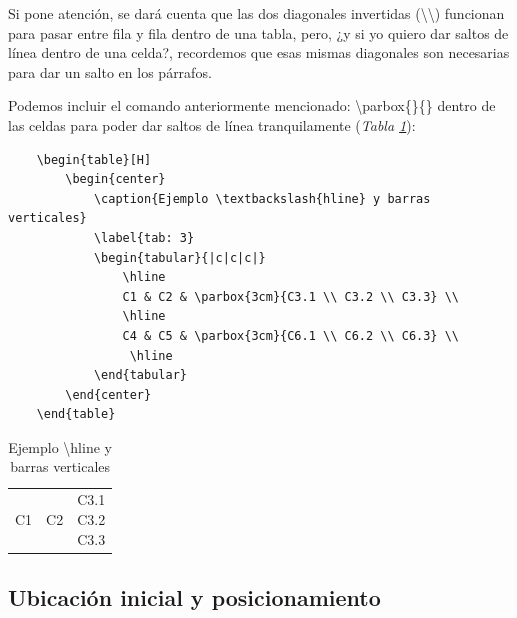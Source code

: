Si pone atención, se dará cuenta que las dos diagonales invertidas (\textbackslash\textbackslash) funcionan para pasar entre fila y fila dentro de una tabla, pero, ¿y si yo quiero dar saltos de línea dentro de una celda?, recordemos que esas mismas diagonales son necesarias para dar un salto en los párrafos.

Podemos incluir el comando anteriormente mencionado: \textbackslash{parbox\{\}\{\}} dentro de las celdas para poder dar saltos de línea tranquilamente (\textit{Tabla \ref{tab: 3}}):
\begin{lstlisting}
    \begin{table}[H]
        \begin{center}
            \caption{Ejemplo \textbackslash{hline} y barras verticales}
            \label{tab: 3}
            \begin{tabular}{|c|c|c|}
                \hline
                C1 & C2 & \parbox{3cm}{C3.1 \\ C3.2 \\ C3.3} \\
                \hline
                C4 & C5 & \parbox{3cm}{C6.1 \\ C6.2 \\ C6.3} \\
                 \hline
            \end{tabular}
        \end{center}
    \end{table}
\end{lstlisting}
\begin{table}[H]
    \begin{center}
        \caption{Ejemplo \textbackslash{hline} y barras verticales}
        \label{tab: 3}
        \begin{tabular}{|c|c|c|}
            \hline
            C1 & C2 & \parbox{3cm}{C3.1 \\ C3.2 \\ C3.3} \\
            \hline
            C4 & C5 & \parbox{3cm}{C6.1 \\ C6.2 \\ C6.3} \\
            \hline
        \end{tabular}
    \end{center}
\end{table}


\subsection{Ubicación inicial y posicionamiento}

